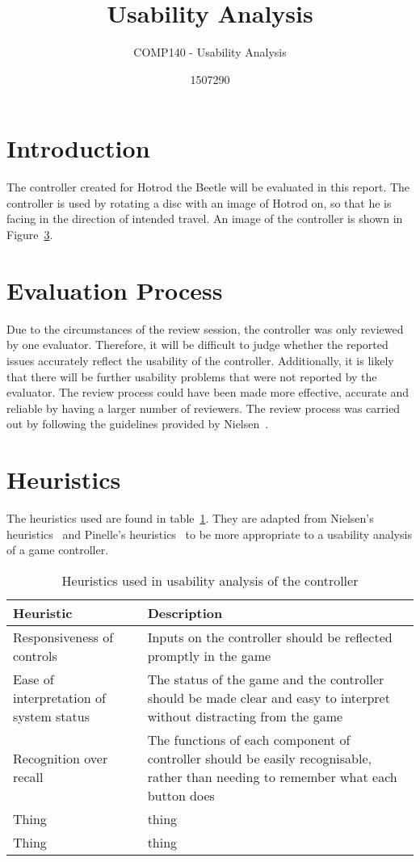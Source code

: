 \documentclass{scrartcl}
\title{Usability Analysis}
\subtitle{COMP140 - Usability Analysis}
\author{1507290}
\begin{document}
\maketitle

\abstract{}

\section{Introduction}
The controller created for Hotrod the Beetle will be evaluated in this report. The controller is used by rotating a disc with an image of Hotrod on, so that he is facing in the direction of intended travel. An image of the controller is shown in Figure~\ref{}.

\section{Evaluation Process}
Due to the circumstances of the review session, the controller was only reviewed by one evaluator. Therefore, it will be difficult to judge whether the reported issues accurately reflect the usability of the controller.  Additionally, it is likely that there will be further usability problems that were not reported by the evaluator. The review process could have been made more effective, accurate and reliable by having a larger number of reviewers. The review process was carried out by following the guidelines provided by Nielsen~\cite{}.

\section{Heuristics}
The heuristics used are found in table~\ref{table:heuristics}. They are adapted from Nielsen's heuristics~\cite{} and Pinelle's heuristics~\cite{} to be more appropriate to a usability analysis of a game controller.

\begin{table}
\centering
\begin{tabular}{| l | p{6cm} |}
\hline
\textbf{Heuristic} & \textbf{Description} \\ \hline
Responsiveness of controls & Inputs on the controller should be reflected promptly in the game \\ \hline
Ease of interpretation of system status & The status of the game and the controller should be made clear and easy to interpret without distracting from the game \\ \hline
Recognition over recall & The functions of each component of controller should be easily recognisable, rather than needing to remember what each button does \\ \hline
Thing & thing \\ \hline
Thing & thing \\ \hline
\end{tabular}
\caption{Heuristics used in usability analysis of the controller}
\label{table:heuristics}
\end{table}
\end{document}
